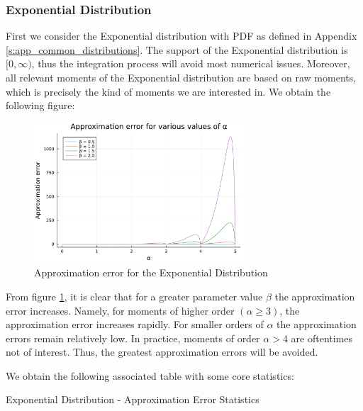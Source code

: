 \subsubsection{Exponential Distribution}
First we consider the Exponential distribution with PDF as defined in Appendix \ref{s:app_common_distributions}.
The support of the Exponential distribution is \([0, \infty)\), thus the integration process will avoid most numerical issues. Moreover, all relevant moments of the Exponential distribution are based on raw moments, which is precisely the kind of moments we are interested in.
\newline
We obtain the following figure:
\begin{figure}[H]
    \centering
    \includegraphics[width=0.7\textwidth]{figures/error_plot_exp.pdf}
    \caption{Approximation error for the Exponential Distribution}
    \label{fig:error_plot_exp}
\end{figure}
From figure \ref{fig:error_plot_exp}, it is clear that for a greater parameter value \(\beta\) the approximation error increases. Namely, for moments of higher order \((\alpha \geq 3)\), the approximation error increases rapidly. For smaller orders of \(\alpha\) the approximation errors remain relatively low. In practice, moments of order \(\alpha > 4\) are oftentimes not of interest. Thus, the greatest approximation errors will be avoided.

We obtain the following associated table with some core statistics:
\begin{table}[H]
    \centering

\caption{Exponential Distribution - Approximation Error Statistics} 
\label{tab:exp_error}
\end{table}


